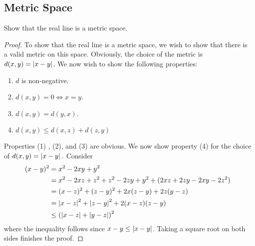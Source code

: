 
\subsection{Metric Space}


\begin{question}
    Show that the real line is a metric space.
\label{section1.1-1}
\end{question}
\begin{proof}
    To show that the real line is a metric space, we wish to show that there is a valid metric on this space. Obviously, the choice of the metric is $d(x,y) = \left\lvert x-y \right\rvert$. We now wish to show the following properties:
    \begin{enumerate}
        \item $d$ is non-negative.
        \item $d(x,y) = 0 \iff x = y$.
        \item $d(x,y) = d(y,x)$.
        \item $d(x,y) \leq d(x,z) + d(z,y)$
    \end{enumerate}
    Properties (1) , (2), and (3) are obvious. We now show property (4) for the choice of $d(x,y) = \left\lvert x-y \right\rvert.$ Consider
    \begin{align*}
        (x-y)^2 &= x^2 - 2xy + y^2
        \\
        &= x^2 - 2xz + z^2 + z^2 - 2zy + y^2 + (2xz + 2zy - 2xy - 2z^2)
        \\
        &= (x-z)^2 + (z-y)^2 + 2x(z-y) + 2z(y-z)
        \\
        &= \left\lvert x-z \right\rvert^2 + \left\lvert z-y \right\rvert^2  + 2(x-z)(z-y)
        \\
        &\leq \left( \left\lvert x-z \right\rvert + \left\lvert y-z \right\rvert \right)^2
    \end{align*}
    where the inequality follows since $x-y \leq \left\lvert x-y \right\rvert$. Taking a square root on both sides finishes the proof.
\end{proof}

